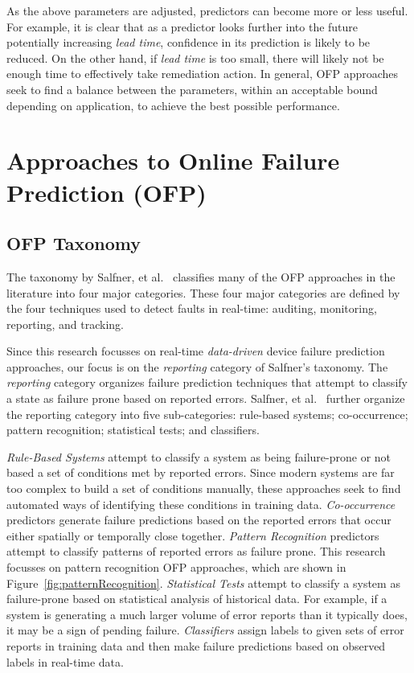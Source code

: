 As the above parameters are adjusted, predictors can become more or less
useful.  For example, it is clear that as a predictor looks further into the
future potentially increasing \emph{lead time}, confidence in its prediction is
likely to be reduced.  On the other hand, if \emph{lead time} is too small,
there will likely not be enough time to effectively take remediation action.
In general, OFP approaches seek to find a balance between the parameters,
within an acceptable bound depending on application, to achieve the best
possible performance.

\section{Approaches to Online Failure Prediction (OFP)} \label{approaches}
\subsection{OFP Taxonomy}
The taxonomy by Salfner, et al.~\cite{salfnerSurvey} classifies many of the OFP
approaches in the literature into four major categories.  These four major
categories are defined by the four techniques used to detect faults in
real-time: auditing, monitoring, reporting, and tracking.

Since this research focusses on real-time \emph{data-driven} device failure
prediction approaches, our focus is on the \emph{reporting} category of
Salfner's taxonomy.  The \emph{reporting} category organizes failure prediction
techniques that attempt to classify a state as failure prone based on reported
errors.  Salfner, et al.~\cite{salfnerSurvey} further organize the reporting
category into five sub-categories: rule-based systems; co-occurrence; pattern
recognition; statistical tests; and classifiers.

\emph{Rule-Based Systems} attempt to classify a system as being failure-prone
or not based a set of conditions met by reported errors.  Since modern systems
are far too complex to build a set of conditions manually, these approaches
seek to find automated ways of identifying these conditions in training data.
\emph{Co-occurrence} predictors generate failure predictions based on the
reported errors that occur either spatially or temporally close together.
\emph{Pattern Recognition} predictors attempt to classify patterns of reported
errors as failure prone.  This research focusses on pattern recognition OFP
approaches, which are shown in Figure~\ref{fig:patternRecognition}.
\emph{Statistical Tests} attempt to classify a system as failure-prone based on
statistical analysis of historical data.  For example, if a system is
generating a much larger volume of error reports than it typically does, it may
be a sign of pending failure.  \emph{Classifiers} assign labels to given sets
of error reports in training data and then make failure predictions based on
observed labels in real-time data.

